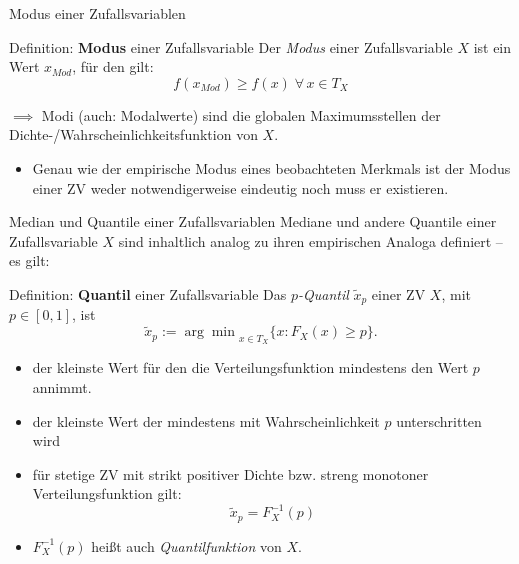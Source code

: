 \documentclass[
  10pt,
  ignorenonframetext,
]{beamer}
\providecommand{\tightlist}{%
  \setlength{\itemsep}{0pt}\setlength{\parskip}{0pt}}
\begin{document}
\begin{frame}{Modus einer Zufallsvariablen}
\protect\hypertarget{modus-einer-zufallsvariablen}{}
\begin{block}{Definition: \textbf{Modus} einer Zufallsvariable}
\protect\hypertarget{definition-modus-einer-zufallsvariable}{}
Der \emph{Modus} einer Zufallsvariable \(X\) ist ein Wert \(x_{Mod}\),
für den gilt: \[
f(x_{Mod}) \geq f(x)\;\forall\, x \in T_X 
\]
\end{block}

\(\implies\) Modi (auch: Modalwerte) sind die globalen Maximumsstellen
der Dichte-/Wahrscheinlichkeitsfunktion von \(X\).

\begin{itemize}
\tightlist
\item
  Genau wie der empirische Modus eines beobachteten Merkmals ist der
  Modus einer ZV weder notwendigerweise eindeutig noch muss er
  existieren.
\end{itemize}
\end{frame}

\begin{frame}{Median und Quantile einer Zufallsvariablen}
\protect\hypertarget{median-und-quantile-einer-zufallsvariablen}{}
Mediane und andere Quantile einer Zufallsvariable \(X\) sind inhaltlich
analog zu ihren empirischen Analoga definiert -- es gilt:

\begin{block}{Definition: \textbf{Quantil} einer Zufallsvariable}
\protect\hypertarget{definition-quantil-einer-zufallsvariable}{}
Das \emph{\(p\)-Quantil} \(\tilde x_p\) einer ZV \(X\), mit
\(p \in [0, 1]\), ist
\[\tilde x_p := {\arg\min}_{x \in T_X}\{x: F_X(x) \geq p\}.\]
\end{block}

\begin{itemize}
\tightlist
\item
  der kleinste Wert für den die Verteilungsfunktion mindestens den Wert
  \(p\) annimmt.
\item
  der kleinste Wert der mindestens mit Wahrscheinlichkeit \(p\)
  unterschritten wird
\item
  für stetige ZV mit strikt positiver Dichte bzw. streng monotoner
  Verteilungsfunktion gilt: \[\tilde x_p = F_X^{-1}(p)\]
\item
  \(F_X^{-1}(p)\) heißt auch \emph{Quantilfunktion} von \(X\).
\end{itemize}
\end{frame}
\end{document}
